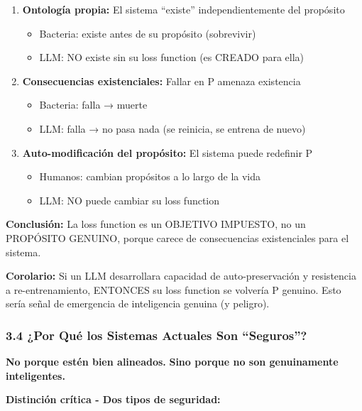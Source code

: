 \begin{enumerate}
\def\labelenumi{\arabic{enumi}.}
\tightlist
\item
  \textbf{Ontología propia:} El sistema ``existe'' independientemente
  del propósito

  \begin{itemize}
  \tightlist
  \item
    Bacteria: existe antes de su propósito (sobrevivir)
  \item
    LLM: NO existe sin su loss function (es CREADO para ella)
  \end{itemize}
\item
  \textbf{Consecuencias existenciales:} Fallar en P amenaza existencia

  \begin{itemize}
  \tightlist
  \item
    Bacteria: falla → muerte
  \item
    LLM: falla → no pasa nada (se reinicia, se entrena de nuevo)
  \end{itemize}
\item
  \textbf{Auto-modificación del propósito:} El sistema puede redefinir P

  \begin{itemize}
  \tightlist
  \item
    Humanos: cambian propósitos a lo largo de la vida
  \item
    LLM: NO puede cambiar su loss function
  \end{itemize}
\end{enumerate}

\textbf{Conclusión:} La loss function es un OBJETIVO IMPUESTO, no un
PROPÓSITO GENUINO, porque carece de consecuencias existenciales para el
sistema.

\textbf{Corolario:} Si un LLM desarrollara capacidad de
auto-preservación y resistencia a re-entrenamiento, ENTONCES su loss
function se volvería P genuino. Esto sería señal de emergencia de
inteligencia genuina (y peligro).

\subsubsection{3.4 ¿Por Qué los Sistemas Actuales Son
``Seguros''?}\label{por-quuxe9-los-sistemas-actuales-son-seguros}

\textbf{No porque estén bien alineados.} \textbf{Sino porque no son
genuinamente inteligentes.}

\textbf{Distinción crítica - Dos tipos de seguridad:}

